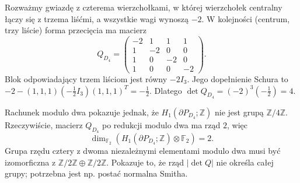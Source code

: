 \begin{przyklad}
Rozważmy gwiazdę z czterema wierzchołkami, w której
wierzchołek centralny łączy się z trzema liśćmi,
a wszystkie wagi wynoszą $-2$. W kolejności
(centrum, trzy liście) forma przecięcia ma macierz
\[
Q_{D_4}=\begin{pmatrix}
-2&1&1&1\\1&-2&0&0\\1&0&-2&0\\1&0&0&-2
\end{pmatrix}.
\]
Blok odpowiadający trzem liściom jest równy $-2I_3$.
Jego dopełnienie Schura to
$-2-(1,1,1)(-\tfrac12I_3)(1,1,1)^T=-\tfrac12$.
Dlatego $\det Q_{D_4}=(-2)^3(-\tfrac12)=4$.

Rachunek modulo dwa pokazuje jednak, że
$H_1(\partial P_{D_4};\mathbb Z)$ nie jest grupą
$\mathbb Z/4\mathbb Z$. Rzeczywiście, macierz
$Q_{D_4}$ po redukcji modulo dwa ma rząd $2$, więc
\[
\dim_{\mathbb F_2}
(H_1(\partial P_{D_4};\mathbb Z)\otimes\mathbb F_2)=2.
\]
Grupa rzędu cztery z dwoma niezależnymi elementami
modulo dwa musi być izomorficzna z
$\mathbb Z/2\mathbb Z\oplus\mathbb Z/2\mathbb Z$.
Pokazuje to, że rząd $|\det Q|$ nie określa całej
grupy; potrzebna jest np. postać normalna Smitha.
\end{przyklad}

\begin{center}
\end{center}

